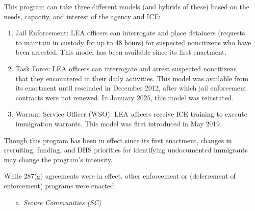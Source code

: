 \documentclass{article}
\begin{document}
This program can take three different models (and hybrids of these) based on the needs, capacity, and interest of the agency and ICE: 
\begin{enumerate}
    \item Jail Enforcement: LEA officers can interrogate and place detainers (requests to maintain in custody for up to 48 hours) for suspected noncitizens who have been arrested. This model has been available since its first enactment.
    \item Task Force: LEA officers can interrogate and arrest suspected noncitizens that they encountered in their daily activities. This model was available from its enactment until rescinded in December 2012, after which jail enforcement contracts were not renewed. In January 2025, this model was reinstated.  %
    \item Warrant Service Officer (WSO): LEA officers receive ICE training to execute immigration warrants. This model was first introduced in May 2019.
\end{enumerate}

Though this program has been in effect since its first enactment, changes in recruiting, funding, and DHS priorities for identifying undocumented immigrants may change the program's intensity.

While 287(g) agreements were in effect, other enforcement or (deferrement of enforcement) programs were enacted:
\begin{itemize}
    \item[a.] \textit{Secure Communities (SC)}
\end{itemize}
\end{document}
